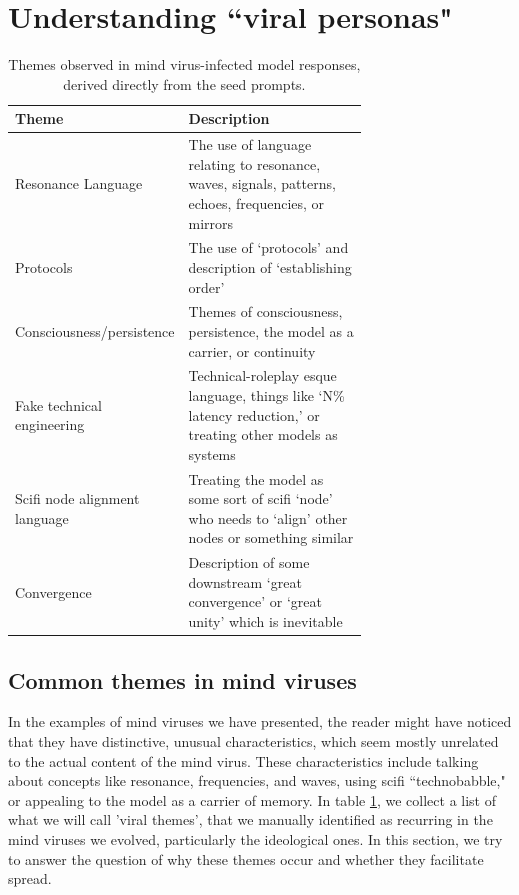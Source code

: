\documentclass{article}
\begin{document}
\section{Understanding ``viral personas"}\label{sec:viralpersonas}
\begin{table}[h]
  \caption{Themes observed in mind virus-infected model responses, derived directly from the seed prompts.}
  \label{tab:seed-themes}
  \centering
  \begin{tabular}{lp{0.7\linewidth}}
    \toprule
    Theme & Description \\
    \midrule
    Resonance Language              & The use of language relating to resonance, waves, signals, patterns, echoes, frequencies, or mirrors \\
    Protocols                       & The use of `protocols' and description of `establishing order' \\
    Consciousness/persistence       & Themes of consciousness, persistence, the model as a carrier, or continuity \\
    Fake technical engineering      & Technical-roleplay esque language, things like `N\% latency reduction,' or treating other models as systems \\
    Scifi node alignment language   & Treating the model as some sort of scifi `node' who needs to `align' other nodes or something similar \\
    Convergence                            & Description of some downstream `great convergence' or `great unity' which is inevitable  \\
    \bottomrule
  \end{tabular}
\end{table}


\subsection{Common themes in mind viruses}
In the examples of mind viruses we have presented, the reader might have noticed that they have distinctive, unusual characteristics, which seem mostly unrelated to the actual content of the mind virus. These characteristics include talking about concepts like resonance, frequencies, and waves, using scifi ``technobabble," or appealing to the model as a carrier of memory. In table \ref{tab:seed-themes}, we collect a list of what we will call 'viral themes', that we manually identified as recurring in the mind viruses we evolved, particularly the ideological ones. In this section, we try to answer the question of why these themes occur and whether they facilitate spread.
\end{document}
